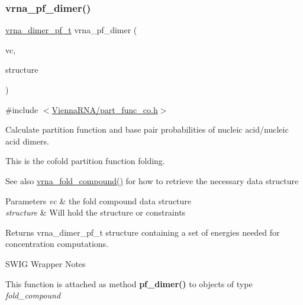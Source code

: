 \subsubsection{\texorpdfstring{vrna\+\_\+pf\+\_\+dimer()}{vrna\_pf\_dimer()}}
{\footnotesize\ttfamily \hyperlink{group__pf__cofold_ga444df1587c9a2ca15b8eb25188f629c3}{vrna\+\_\+dimer\+\_\+pf\+\_\+t} vrna\+\_\+pf\+\_\+dimer (\begin{DoxyParamCaption}\item[{\hyperlink{group__fold__compound_ga1b0cef17fd40466cef5968eaeeff6166}{vrna\+\_\+fold\+\_\+compound\+\_\+t} $\ast$}]{vc,  }\item[{char $\ast$}]{structure }\end{DoxyParamCaption})}



{\ttfamily \#include $<$\hyperlink{part__func__co_8h}{Vienna\+R\+N\+A/part\+\_\+func\+\_\+co.\+h}$>$}



Calculate partition function and base pair probabilities of nucleic acid/nucleic acid dimers. 

This is the cofold partition function folding.

\begin{DoxySeeAlso}{See also}
\hyperlink{group__fold__compound_ga6601d994ba32b11511b36f68b08403be}{vrna\+\_\+fold\+\_\+compound()} for how to retrieve the necessary data structure
\end{DoxySeeAlso}

\begin{DoxyParams}{Parameters}
{\em vc} & the fold compound data structure \\
\hline
{\em structure} & Will hold the structure or constraints \\
\hline
\end{DoxyParams}
\begin{DoxyReturn}{Returns}
vrna\+\_\+dimer\+\_\+pf\+\_\+t structure containing a set of energies needed for concentration computations.
\end{DoxyReturn}
\begin{DoxyRefDesc}{S\+W\+I\+G Wrapper Notes}
\item[\hyperlink{wrappers__wrappers000055}{S\+W\+I\+G Wrapper Notes}]This function is attached as method {\bfseries pf\+\_\+dimer()} to objects of type {\itshape fold\+\_\+compound} \end{DoxyRefDesc}
\mbox{\label{group__pf__cofold_gaa1e39e73afb51fbaf4ae38f0c066c46b}} 
